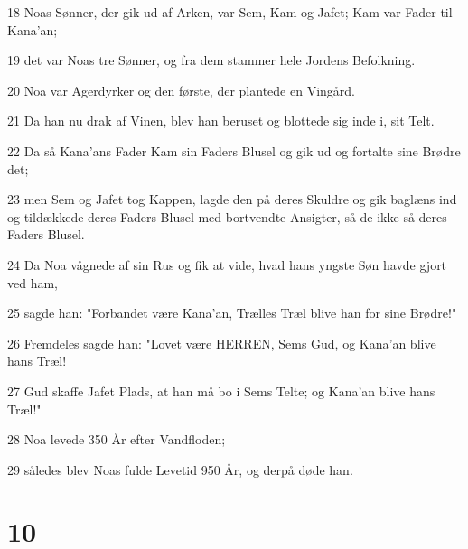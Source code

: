 \par 18 Noas Sønner, der gik ud af Arken, var Sem, Kam og Jafet; Kam var Fader til Kana'an;
\par 19 det var Noas tre Sønner, og fra dem stammer hele Jordens Befolkning.
\par 20 Noa var Agerdyrker og den første, der plantede en Vingård.
\par 21 Da han nu drak af Vinen, blev han beruset og blottede sig inde i, sit Telt.
\par 22 Da så Kana'ans Fader Kam sin Faders Blusel og gik ud og fortalte sine Brødre det;
\par 23 men Sem og Jafet tog Kappen, lagde den på deres Skuldre og gik baglæns ind og tildækkede deres Faders Blusel med bortvendte Ansigter, så de ikke så deres Faders Blusel.
\par 24 Da Noa vågnede af sin Rus og fik at vide, hvad hans yngste Søn havde gjort ved ham,
\par 25 sagde han: "Forbandet være Kana'an, Trælles Træl blive han for sine Brødre!"
\par 26 Fremdeles sagde han: "Lovet være HERREN, Sems Gud, og Kana'an blive hans Træl!
\par 27 Gud skaffe Jafet Plads, at han må bo i Sems Telte; og Kana'an blive hans Træl!"
\par 28 Noa levede 350 År efter Vandfloden;
\par 29 således blev Noas fulde Levetid 950 År, og derpå døde han.

\chapter{10}

